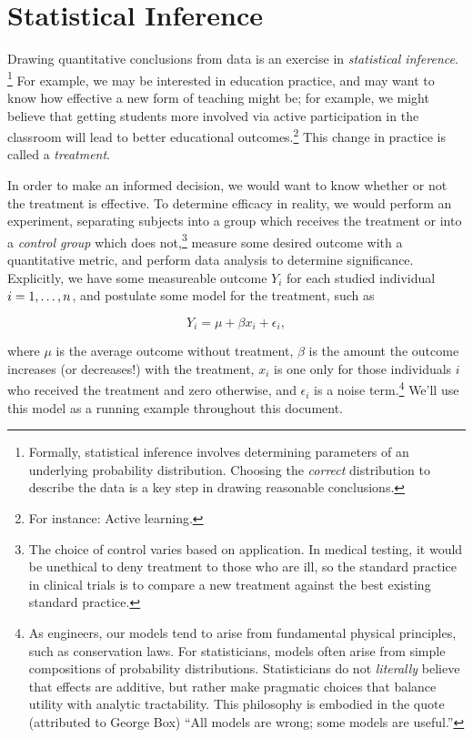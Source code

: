 \documentclass{tufte-handout}
\begin{document}
\section{Statistical Inference}
\label{sec:org03f2f4e}
Drawing quantitative conclusions from data is an exercise in \emph{statistical
inference}. \footnote{Formally, statistical inference involves determining parameters
of an underlying probability distribution. Choosing the \emph{correct} distribution
to describe the data is a key step in drawing reasonable conclusions.} For
example, we may be interested in education practice, and may want to know how
effective a new form of teaching might be; for example, we might believe that
getting students more involved via active participation in the classroom will
lead to better educational outcomes.\footnote{For instance: Active
learning.\cite{freeman2014active}} This change in practice is called a
\emph{treatment}.

In order to make an informed decision, we would want to know whether or not the
treatment is effective. To determine efficacy in reality, we would perform an
experiment, separating subjects into a group which receives the treatment or
into a \emph{control group} which does not,\footnote{The choice of control varies based on
application. In medical testing, it would be unethical to deny treatment to
those who are ill, so the standard practice in clinical trials is to compare a
new treatment against the best existing standard practice.} measure some desired
outcome with a quantitative metric, and perform data analysis to determine
significance. Explicitly, we have some measureable outcome \(Y_i\) for each
studied individual \(i=\nobreak1,\dots,n\), and postulate some model for the treatment,
such as

\begin{equation}\label{eq:model}
  Y_i = \mu + \beta x_i + \epsilon_i,
\end{equation}

where \(\mu\) is the average outcome without treatment, \(\beta\) is the amount the
outcome increases (or decreases!) with the treatment, \(x_i\) is one only for
those individuals \(i\) who received the treatment and zero otherwise, and
\(\epsilon_i\) is a noise term.\footnote{As engineers, our models tend to arise from
fundamental physical principles, such as conservation laws. For statisticians,
models often arise from simple compositions of probability distributions.
Statisticians do not \emph{literally} believe that effects are additive, but rather
make pragmatic choices that balance utility with analytic tractability. This
philosophy is embodied in the quote (attributed to George Box) ``All models are
wrong; some models are useful.''} We'll use this model as a running example
throughout this document.
\end{document}
